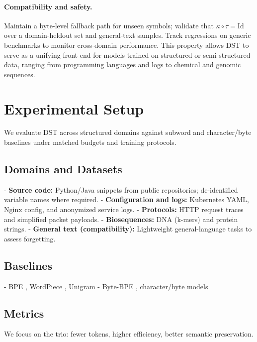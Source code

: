 \paragraph{Compatibility and safety.} Maintain a byte-level fallback path for unseen symbols; validate that $\kappa\!\circ\!\tau=\mathrm{Id}$ over a domain-heldout set and general-text samples. Track regressions on generic benchmarks to monitor cross-domain performance.
This property allows DST to serve as
a unifying front-end for models trained on
structured or semi-structured data,
ranging from programming languages and logs
to chemical and genomic sequences.

\section{Experimental Setup}
\label{sec:setup}

We evaluate DST across structured domains against subword and character/byte baselines under matched budgets and training protocols.

\subsection{Domains and Datasets}

- \textbf{Source code:} Python/Java snippets from public repositories; de-identified variable names where required.
- \textbf{Configuration and logs:} Kubernetes YAML, Nginx config, and anonymized service logs.
- \textbf{Protocols:} HTTP request traces and simplified packet payloads.
- \textbf{Biosequences:} DNA (k-mers) and protein strings.
- \textbf{General text (compatibility):} Lightweight general-language tasks to assess forgetting.

\subsection{Baselines}

- BPE \citep{gage1994bpe}, WordPiece \citep{wu2016google}, Unigram \citep{kudo2018sentencepiece}
- Byte-BPE \citep{radford2019gpt2}, character/byte models \citep{xue2022byt5, clark2022canine}

\subsection{Metrics}

We focus on the trio: fewer tokens, higher efficiency, better semantic preservation.

